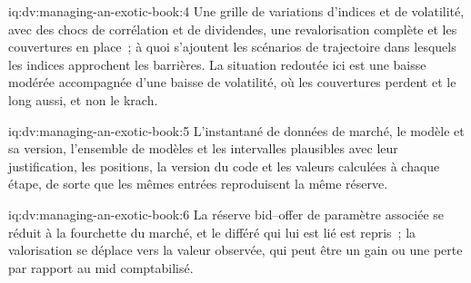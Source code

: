 \begin{solution}{iq:dv:managing-an-exotic-book:4}
Une grille de variations d'indices et de volatilité, avec des chocs de corrélation et de dividendes, une revalorisation complète et les couvertures en place~; à quoi s'ajoutent les scénarios de trajectoire dans lesquels les indices approchent les
barrières. La situation redoutée ici est une baisse modérée accompagnée d'une baisse de volatilité, où les couvertures perdent et le  long aussi, et non le krach.
\end{solution}

\begin{solution}{iq:dv:managing-an-exotic-book:5}
L'instantané de données de marché, le modèle et sa version, l'ensemble de modèles et les intervalles plausibles avec leur justification, les positions, la version du code et les valeurs calculées à chaque
étape, de sorte que les mêmes entrées reproduisent la même réserve.
\end{solution}

\begin{solution}{iq:dv:managing-an-exotic-book:6}
La réserve bid--offer de paramètre associée se réduit à la fourchette du marché, et le  différé qui lui est lié est repris~; la valorisation se déplace vers la valeur observée, qui peut être un gain
ou une perte par rapport au mid comptabilisé.
\end{solution}
